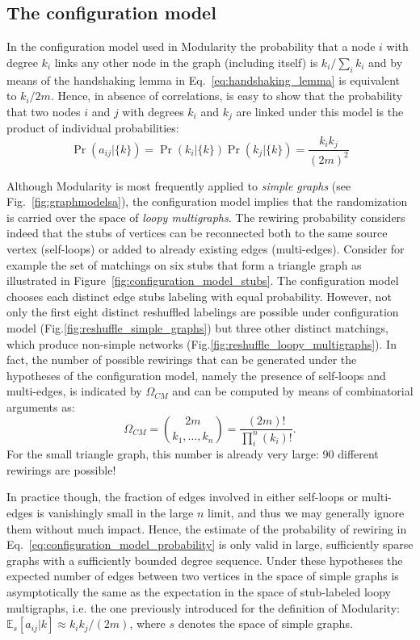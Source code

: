 \newpage
\subsection{The configuration model}
In the configuration model used in Modularity the probability that a node $i$ with degree $k_i$ links any other node in the graph (including itself) is $k_i/\sum_{i}k_i$ and by means of the handshaking lemma in Eq.~\ref{eq:handshaking_lemma} is equivalent to $k_i/2m$.
Hence, in absence of correlations, is easy to show that the probability that two nodes $i$ and $j$ with degrees $k_i$ and $k_j$ are linked under this model is the product of individual probabilities:
\begin{equation}\label{eq:configuration_model_probability}
\Pr \left ( a_{ij} | \{ k \} \right) = \Pr(k_i | \{ k \})\Pr(k_j | \{ k \})=\frac{k_i k_j}{(2m)^2}
\end{equation}

Although Modularity is most frequently applied to \emph{simple graphs} (see Fig.~\ref{fig:graphmodelsa}), the configuration model implies that the randomization is carried over the space of \emph{loopy multigraphs}.
The rewiring probability considers indeed that the stubs of vertices can be reconnected both to the same source vertex (self-loops) or added to already existing edges (multi-edges).
Consider for example the set of matchings on six stubs that form a triangle graph as illustrated in Figure~\ref{fig:configuration_model_stubs}. The configuration model chooses each distinct edge stubs labeling with equal probability. However, not only the first eight distinct reshuffled labelings are possible under configuration model (Fig.\ref{fig:reshuffle_simple_graphs}) but three other distinct matchings, which produce non-simple networks (Fig.\ref{fig:reshuffle_loopy_multigraphs}). 
In fact, the number of possible rewirings that can be generated under the hypotheses of the configuration model, namely the presence of self-loops and multi-edges, is indicated by $\Omega_{CM}$ and can be computed by means of combinatorial arguments as:
\begin{equation}\label{eq:cm_possible_rewirings}
\Omega_{CM} = \binom{2m}{k_1,\ldots,k_n} = \frac{(2m)!}{\prod_i^n (k_i)!}.
\end{equation}
For the small triangle graph, this number is already very large: 90 different rewirings are possible!

In practice though, the fraction of edges involved in either self-loops or multi-edges is vanishingly small in the large $n$ limit, and thus we may generally ignore them without much impact. 
Hence, the estimate of the probability of rewiring in Eq.~\ref{eq:configuration_model_probability} is only valid in large, sufficiently sparse graphs with a sufficiently bounded degree sequence.
Under these hypotheses the expected number of edges between two vertices in the space of simple graphs is asymptotically the same as the expectation in the space of stub-labeled loopy multigraphs, i.e. the one previously introduced for the definition of Modularity: $\mathbb{E}_s[a_{ij} |k] \approx k_i k_j /(2m)$, where $s$ denotes the space of simple graphs.

